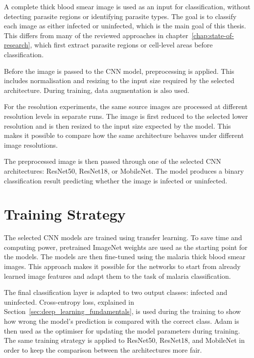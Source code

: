 {\FloatBarrier

A complete thick blood smear image is used as an input for classification, without detecting parasite regions or identifying parasite types. The goal is to classify each image as either infected or uninfected, which is the main goal of this thesis. This differs from many of the reviewed approaches in chapter~\ref{chap:state-of-research}, which first extract parasite regions or cell-level areas before classification.

Before the image is passed to the CNN model, preprocessing is applied. This includes normalisation and resizing to the input size required by the selected architecture. During training, data augmentation is also used.

For the resolution experiments, the same source images are processed at different resolution levels in separate runs. The image is first reduced to the selected lower resolution and is then resized to the input size expected by the model. This makes it possible to compare how the same architecture behaves under different image resolutions.

The preprocessed image is then passed through one of the selected CNN architectures: ResNet50, ResNet18, or MobileNet. The model produces a binary classification result predicting whether the image is infected or uninfected.

\section{Training Strategy}
\label{sec:training_strategy}

The selected CNN models are trained using transfer learning. To save time and computing power, pretrained ImageNet weights are used as the starting point for the models. The models are then fine-tuned using the malaria thick blood smear images. This approach makes it possible for the networks to start from already learned image features and adapt them to the task of malaria classification.

The final classification layer is adapted to two output classes: infected and uninfected. Cross-entropy loss, explained in Section~\ref{sec:deep_learning_fundamentals}, is used during the training to show how wrong the model’s prediction is compared with the correct class. Adam is then used as the optimiser for updating the model parameters during training. The same training strategy is applied to ResNet50, ResNet18, and MobileNet in order to keep the comparison between the architectures more fair.

}
